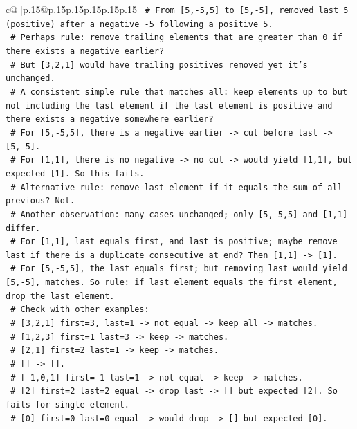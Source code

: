 \documentclass{article}
\begin{document}
{\begin{supertabular}{c@{$\;$}|p{.15\linewidth}@{}p{.15\linewidth}p{.15\linewidth}p{.15\linewidth}p{.15\linewidth}p{.15\linewidth}}
{{{\texttt{    \# From {[}5,{-}5,5{]} to {[}5,{-}5{]}, removed last 5 (positive) after a negative {-}5 following a positive 5.} \\
\texttt{    \# Perhaps rule: remove trailing elements that are greater than 0 if there exists a negative earlier?} \\
\texttt{    \# But {[}3,2,1{]} would have trailing positives removed yet it's unchanged.} \\
\texttt{    \# A consistent simple rule that matches all: keep elements up to but not including the last element if the last element is positive and there exists a negative somewhere earlier?} \\
\texttt{    \# For {[}5,{-}5,5{]}, there is a negative earlier {-}> cut before last {-}> {[}5,{-}5{]}.} \\
\texttt{    \# For {[}1,1{]}, there is no negative {-}> no cut {-}> would yield {[}1,1{]}, but expected {[}1{]}. So this fails.} \\
\texttt{    \# Alternative rule: remove last element if it equals the sum of all previous? Not.} \\
\texttt{    \# Another observation: many cases unchanged; only {[}5,{-}5,5{]} and {[}1,1{]} differ.} \\
\texttt{    \# For {[}1,1{]}, last equals first, and last is positive; maybe remove last if there is a duplicate consecutive at end? Then {[}1,1{]} {-}> {[}1{]}.} \\
\texttt{    \# For {[}5,{-}5,5{]}, the last equals first; but removing last would yield {[}5,{-}5{]}, matches. So rule: if last element equals the first element, drop the last element.} \\
\texttt{    \# Check with other examples:} \\
\texttt{    \# {[}3,2,1{]} first=3, last=1 {-}> not equal {-}> keep all {-}> matches.} \\
\texttt{    \# {[}1,2,3{]} first=1 last=3 {-}> keep {-}> matches.} \\
\texttt{    \# {[}2,1{]} first=2 last=1 {-}> keep {-}> matches.} \\
\texttt{    \# {[}{]} {-}> {[}{]}.} \\
\texttt{    \# {[}{-}1,0,1{]} first={-}1 last=1 {-}> not equal {-}> keep {-}> matches.} \\
\texttt{    \# {[}2{]} first=2 last=2 equal {-}> drop last {-}> {[}{]} but expected {[}2{]}. So fails for single element.} \\
\texttt{    \# {[}0{]} first=0 last=0 equal {-}> would drop {-}> {[}{]} but expected {[}0{]}.} \\
}}}
\end{supertabular}}
\end{document}
